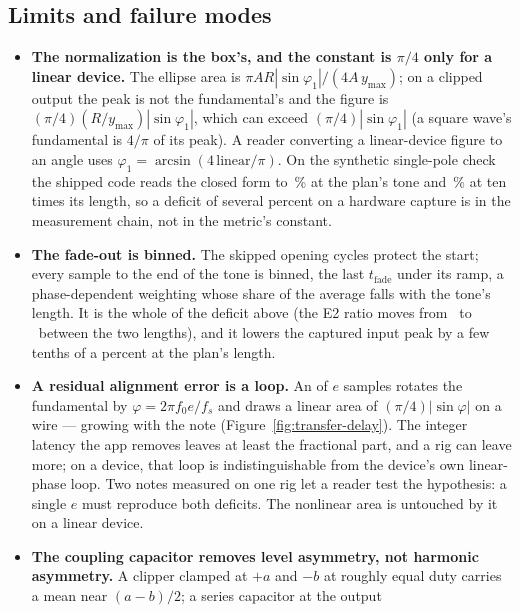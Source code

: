 \documentclass[11pt,a4paper]{article}
\begin{document}
\subsection{Limits and failure modes}
\label{sec:transfer-limits}
{\sloppy
\begin{itemize}
  \item \textbf{The normalization is the box's, and the constant is
  $\pi/4$ only for a linear device.} The ellipse area is $\pi A R
  |\sin\varphi_1| / (4 A\,y_{\max})$; on a clipped output the peak is not
  the fundamental's and the figure is $(\pi/4)(R/y_{\max})|\sin\varphi_1|$,
  which can exceed $(\pi/4)|\sin\varphi_1|$ (a square wave's fundamental is
  $4/\pi$ of its peak). A reader converting a linear-device figure to an
  angle uses $\varphi_1 = \arcsin(4\,\mathrm{linear}/\pi)$. On the
  synthetic single-pole check the shipped code reads the closed form to
  \tparityEllipseDeficitShort\,\% at the plan's tone and
  \tparityEllipseDeficitLong\,\% at ten times its length, so a deficit of
  several percent on a hardware capture is in the measurement chain, not in
  the metric's constant.
  \item \textbf{The fade-out is binned.} The skipped opening cycles protect
  the start; every sample to the end of the tone is binned, the last
  $t_{\mathrm{fade}}$ under its ramp, a phase-dependent weighting whose
  share of the average falls with the tone's length. It is the whole of the
  deficit above (the E2 ratio moves from \tparityEtwoRatio\ to
  \tparityEtwoRatioLong\ between the two lengths), and it lowers the
  captured input peak by a few tenths of a percent at the plan's length.
  \item \textbf{A residual alignment error is a loop.} An
   of $e$ samples rotates the fundamental by
  $\varphi = 2\pi f_0 e / f_s$ and draws a linear area of
  $(\pi/4)|\sin\varphi|$ on a wire --- growing with the note
  (Figure~\ref{fig:transfer-delay}). The integer latency the app removes
  leaves at least the fractional part, and a rig can leave more; on a
  device, that loop is indistinguishable from the device's own linear-phase
  loop. Two notes measured on one rig let a reader test the hypothesis:
  a single $e$ must reproduce both deficits. The nonlinear area is untouched
  by it on a linear device.
  \item \textbf{The coupling capacitor removes level asymmetry, not
  harmonic asymmetry.} A clipper clamped at $+a$ and $-b$ at roughly equal
  duty carries a mean near $(a - b)/2$; a series capacitor at the output

\end{itemize}}
\end{document}
